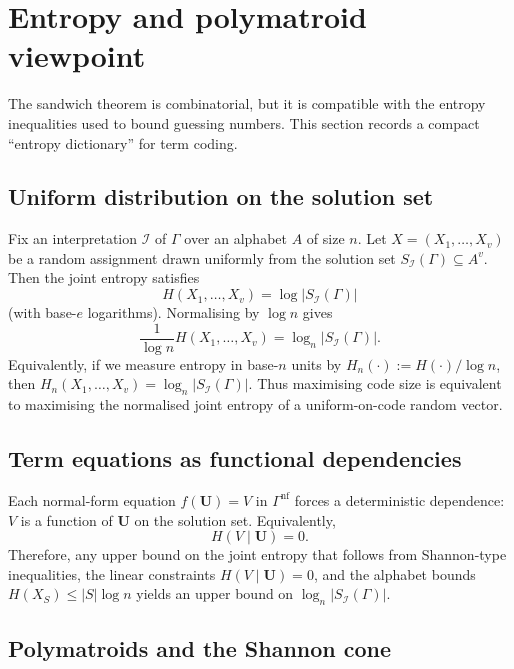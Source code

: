 \documentclass[11pt]{article}
\theoremstyle{plain}
\theoremstyle{definition}
\theoremstyle{definition}
\theoremstyle{remark}
\newcommand{\A}{A}
\newcommand{\SI}{S_{\mathcal I}}
\newcommand{\abs}[1]{\left\lvert #1 \right\rvert}
\newcommand{\logn}{\log_n}
\begin{document}
\section{Entropy and polymatroid viewpoint}
\label{sec:entropy}

The sandwich theorem is combinatorial, but it is compatible with the entropy inequalities used to bound guessing
numbers.
This section records a compact ``entropy dictionary'' for term coding.

\subsection{Uniform distribution on the solution set}

Fix an interpretation $\mathcal I$ of $\Gamma$ over an alphabet $\A$ of size $n$.
Let $X=(X_1,\dots,X_v)$ be a random assignment drawn uniformly from the solution set
$\SI(\Gamma)\subseteq\A^v$.
Then the joint entropy satisfies
\begin{equation}
\label{eq:entropy-logsize}
  H(X_1,\dots,X_v)=\log \abs{\SI(\Gamma)}
\end{equation}
(with base-$e$ logarithms).
Normalising by $\log n$ gives
\[
  \frac{1}{\log n}H(X_1,\dots,X_v)=\logn\abs{\SI(\Gamma)}.
\]
Equivalently, if we measure entropy in base-$n$ units by $H_n(\cdot):=H(\cdot)/\log n$, then
$H_n(X_1,\dots,X_v)=\log_n\abs{\SI(\Gamma)}$.
Thus maximising code size is equivalent to maximising the normalised joint entropy of a uniform-on-code
random vector.

\subsection{Term equations as functional dependencies}

Each normal-form equation $f(\mathbf U)=V$ in $\Gamma^{\mathrm{nf}}$ forces a deterministic dependence:
$V$ is a function of $\mathbf U$ on the solution set.
Equivalently,
\[
  H(V\mid \mathbf U)=0.
\]
Therefore, any upper bound on the joint entropy that follows from Shannon-type inequalities,
the linear constraints $H(V\mid\mathbf U)=0$, and the alphabet bounds $H(X_S)\le|S|\log n$
yields an upper bound on $\logn\abs{\SI(\Gamma)}$.

\subsection{Polymatroids and the Shannon cone}
\end{document}

